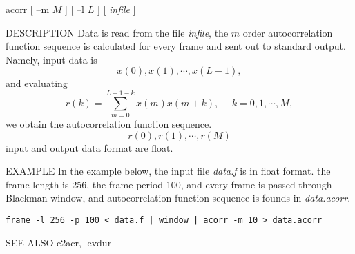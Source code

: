
\begin{synopsis}
 \item[ acorr ] [ --m $M$ ] [ --l $L$ ] [ {\em infile} ]
\end{synopsis}

\begin{qsection}{DESCRIPTION}
 Data is read from the file {\em infile}, the $m$ order autocorrelation
 function sequence is calculated for every frame and sent out to standard
 output. Namely, input data is
\[ x(0),x(1),\cdots,x(L-1), \]
 and evaluating 
\[ r(k)=\sum_{m=0}^{L-1-k}x(m)x(m+k),~~~~~~k=0,1,\cdots,M, \]
 we obtain the autocorrelation function sequence.
\[ r(0),r(1),\cdots,r(M) \]
 input and output data format are float.
\end{qsection}

\begin{options}
\end{options}

\begin{qsection}{EXAMPLE}
In the example below, the input file {\em data.f} is in float format.
the frame length is 256, the frame period 100, and every frame is
passed through Blackman window, and autocorrelation function sequence
is founds in {\em data.acorr}.
\begin{center}
 \verb!frame -l 256 -p 100 < data.f | window | acorr -m 10 > data.acorr!
\end{center}
\end{qsection}

\begin{qsection}{SEE ALSO}
 c2acr, levdur
\end{qsection}

